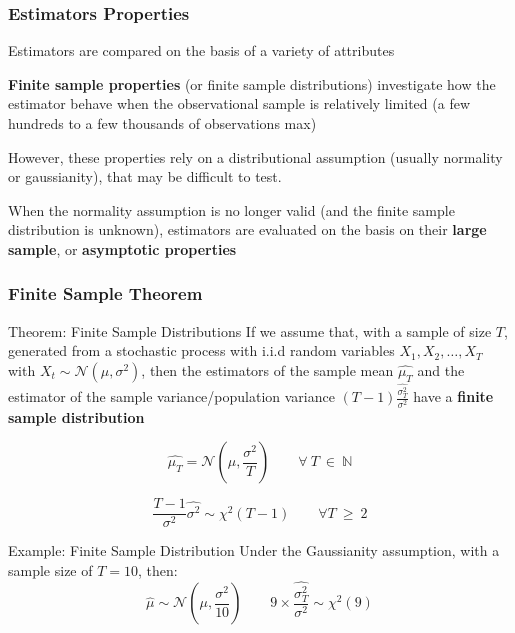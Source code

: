 \documentclass{beamer}
\newenvironment{wideenumerate}{\enumerate\addtolength{\itemsep}{10pt}}{\endenumerate}
\begin{document}
  \begin{frame}
    \frametitle{Estimators Properties}
    Estimators are compared on the basis of a variety of attributes

    \begin{wideenumerate}
      \item \textbf{Finite sample properties} (or finite sample distributions) investigate how the estimator behave when the observational sample is relatively limited (a few hundreds to a few thousands of observations max)
      \item However, these properties rely on a distributional assumption (usually normality or gaussianity), that may be difficult to test. 
      \item When the normality assumption is no longer valid (and the finite sample distribution is unknown), estimators are evaluated on the basis on their \textbf{large sample}, or \textbf{asymptotic properties}
    \end{wideenumerate}    
  \end{frame}


  \begin{frame}
    \frametitle{Finite Sample Theorem}
    \begin{block}{Theorem: Finite Sample Distributions}
        If we assume that, with a sample of size $T$, generated from a stochastic process with i.i.d random variables $X_1, X_2, \dots, X_T$  with $X_{t} \sim \mathcal{N}(\mu, \sigma^2)$, then the estimators of the sample mean $\hat{\mu_T}$ and the estimator of the sample variance/population variance $(T-1) \frac{\hat{\sigma^2_T}}{\sigma^2}$ have a \textbf{finite sample distribution}

        \begin{equation*}
          \hat{\mu_T} = \mathcal{N}\left(\mu, \frac{\sigma^2}{T} \right) \qquad \forall \ T \ \in \ \mathbb{N}
        \end{equation*}


        \begin{equation*}
          \frac{T-1}{\sigma^2} \hat{\sigma^2} \sim \chi^{2} (T-1) \qquad \forall T \ \geq \ 2
        \end{equation*}
        
      \end{block}
\end{frame}


\begin{frame}
      \begin{exampleblock}{Example: Finite Sample Distribution}
        Under the Gaussianity assumption, with a sample size of $T = 10$, then:
        \begin{equation*}
          \hat{\mu} \sim \mathcal{N}\left( \mu, \frac{\sigma^2}{10} \right) \qquad 9 \times \frac{\hat{\sigma^2_T}}{\sigma^2} \sim \chi^2(9)
        \end{equation*}        
      \end{exampleblock}
      
  \end{frame}
  
\end{document}
